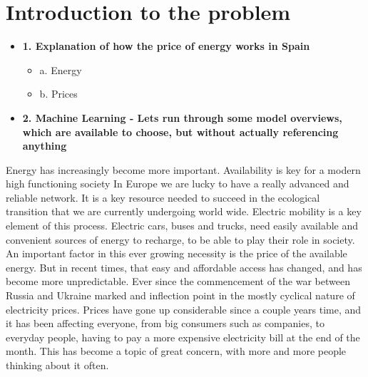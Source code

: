 \documentclass[12pt]{report} %
\begin{document}
\clearpage
{} %





\chapter{Introduction to the problem}
    \begin{itemize}
    \item \textbf{1. Explanation of how the price of energy works in Spain}
        \begin{itemize}
        \item a. Energy
        \item b. Prices
        \end{itemize}
    \item \textbf{2. Machine Learning - Lets run through some model overviews, which are available to choose, but without actually referencing anything}
    \end{itemize}

Energy has increasingly become more important.
Availability is key for a modern high functioning society
In Europe we are lucky to have a really advanced and reliable network.
It is a key resource needed to succeed in the ecological transition that we are currently undergoing world wide.
Electric mobility is a key element of this process.
Electric cars, buses and trucks, need easily available and convenient sources of energy to recharge, to be able to play their role in society.
An important factor in this ever growing necessity is the price of the available energy.
But in recent times, that easy and affordable access has changed, and has become more unpredictable.
Ever since the commencement of the war between Russia and Ukraine marked and inflection point in the mostly cyclical nature of electricity prices.
Prices have gone up considerable since a couple years time, and it has been affecting everyone, from big consumers such as companies, to everyday people, having to pay a more expensive electricity bill at the end of the month.
This has become a topic of great concern, with more and more people thinking about it often.
\end{document}
